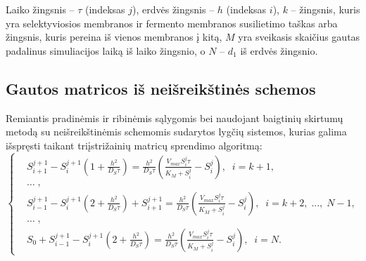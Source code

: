 \documentclass[12pt, a4paper, lithuanian]{article}
\begin{document}
Laiko žingsnis – $\tau$ (indeksas $j$), erdvės žingsnis – $h$ (indeksas $i$),
$k$ – žingsnis, kuris yra selektyviosios membranos ir fermento membranos
susilietimo taškas arba žingsnis, kuris pereina iš vienos membranos į kitą,
$M$ yra sveikasis skaičius gautas padalinus simuliacijos laiką iš laiko
žingsnio, o $N$ – $d_1$ iš erdvės žingsnio.
% 
% 
% 
% 
\subsection{Gautos matricos iš neišreikštinės schemos}

Remiantis pradinėmis ir ribinėmis sąlygomis bei naudojant baigtinių skirtumų
metodą su neišreikštinėmis schemomis sudarytos lygčių sistemos, kurias galima
išspręsti taikant triįstrižainių matricų sprendimo algoritmą:
\begin{equation}\label{eq:S}
\left\{
\begin{aligned}
    &S_{i+1}^{j+1}-S_i^{j+1}\left(1+\frac{h^2}{D_S\tau}\right)
= \frac{h^2}{D_S\tau} \left(\frac{V_{max}S_i^j\tau}{K_M+S_i^j}-S_i^j\right),\; \;
i = k +1,\\
    &\dots\;,\\
    &S_{i-1}^{j+1}-S_i^{j+1}\left(2+\frac{h^2}{D_S\tau}\right)+S_{i+1}^{j+1}
        = \frac{h^2}{D_S\tau}
        \left(\frac{V_{max}S_i^j\tau}{K_M+S_i^j}-S_i^j\right),\; \; i =
        k +2,\;...,\;N-1,\\
    &\dots\;,\\
    &S_0 + S_{i-1}^{j+1} - S_i^{j+1}\left(2+\frac{h^2}{D_S\tau}\right)
        =  \frac{h^2}{D_S\tau}
    \left(\frac{V_{max}S_i^j\tau}{K_M+S_i^j}-S_i^j\right),\; \; i = N.
\end{aligned}
\right.
\end{equation}
\end{document}
